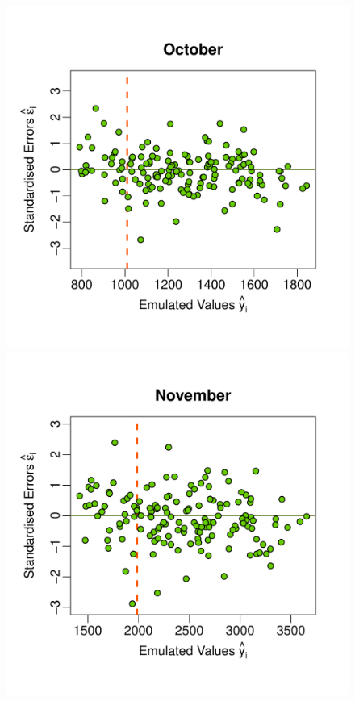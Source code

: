 \documentclass[a4paper, 12pt]{article}
\begin{document}
\begin{figure}
 \includegraphics[width=\scale]{Validation_Plots/Test_Set/Test_Scatter_10_Oct}\hspace{-1ex}
 \includegraphics[width=\scale]{Validation_Plots/Test_Set/Test_Scatter_11_Nov}\hspace{-1ex}

\end{figure}
\end{document}

